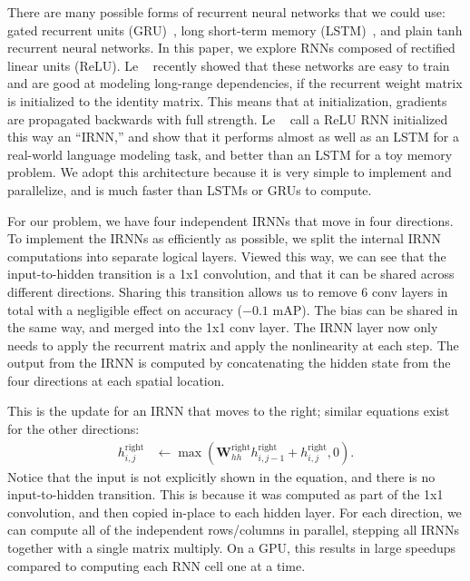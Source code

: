 \documentclass[10pt,twocolumn,letterpaper]{article}
\begin{document}
There are many possible forms of recurrent neural networks that we could use:
gated recurrent units (GRU)~\cite{gru}, long short-term memory
(LSTM)~\cite{lstm}, and plain tanh recurrent neural networks.  In this paper, we
explore RNNs composed of rectified linear units (ReLU).  Le \etal~\cite{irnn} recently
showed that these networks are easy to train and are good at modeling long-range
dependencies, if the recurrent weight matrix is initialized to the identity
matrix.  This means that at initialization, gradients are propagated backwards
with full strength.
Le \etal~\cite{irnn} call a ReLU RNN initialized this way an ``IRNN,'' and show
that it performs almost as well as an LSTM for a real-world language modeling
task, and better than an LSTM for a toy memory problem.  We adopt this
architecture because it is very simple to implement and parallelize, and is much
faster than LSTMs or GRUs to compute.

For our problem, we have four independent IRNNs that move in four directions.
To implement the IRNNs as efficiently as possible, we split the internal IRNN
computations into separate logical layers.  Viewed this way, we can see that
the input-to-hidden transition is a 1x1 convolution, and that it can be shared
across different directions.
Sharing this transition allows us to remove 6 conv layers in total with a
negligible effect on accuracy ($-0.1$ mAP).
The bias can be shared in the same way, and
merged into the 1x1 conv layer.  The IRNN layer now only needs to apply
the recurrent matrix and apply the nonlinearity at each step.  The output
from the IRNN is computed by concatenating the hidden state from the four
directions at each spatial location.

This is the update for an IRNN that moves to the right; similar equations exist
for the other directions:
\begin{align}
  h_{i,j}^\text{right} &\gets \max\left(
    \mathbf{W}_{hh}^\text{right} h_{i,j-1}^\text{right} + h_{i,j}^\text{right},
    0 \right).
  \label{eq:rnn}
\end{align}
Notice that the input is not explicitly shown in the equation, and there is no
input-to-hidden transition.  This is because it was computed as part of the 1x1
convolution, and then copied in-place to each hidden layer.
For each direction, we can compute all of the independent rows/columns in
parallel, stepping all IRNNs together with a single matrix multiply.  On a GPU,
this results in large speedups compared to computing each RNN cell one at a
time.
\end{document}
